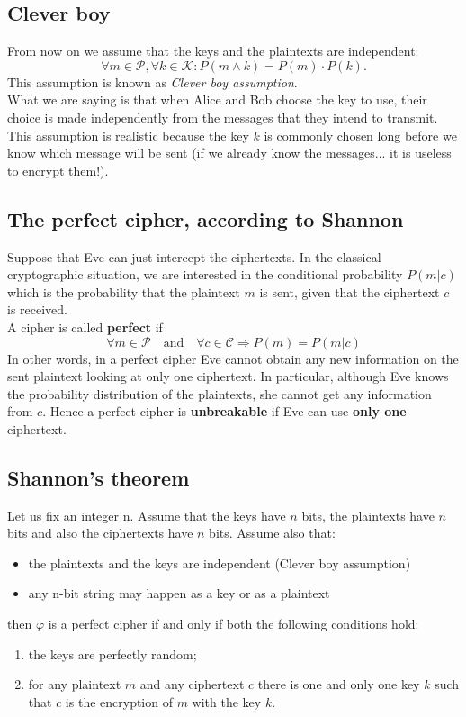\documentclass[a4paper, 10pt, titlepage]{article}
\begin{document}
\subsection{Clever boy}
From now on we assume that the keys and the plaintexts are independent:
$$\forall m \in \mathcal{P}, \forall k \in \mathcal{K} : P(m \wedge k) = P(m) \cdot P(k).$$
This assumption is known as \textit{Clever boy assumption}.\\
What we are saying is that when Alice and Bob choose the key to use,
their choice is made independently from the messages that they intend to transmit. This assumption is realistic because the key $k$ is commonly chosen long before we know which message will be sent (if we already know the messages... it is useless to encrypt them!).

\subsection{The perfect cipher, according to Shannon}
Suppose that Eve can just intercept the ciphertexts. In the classical cryptographic situation, we are interested in the conditional probability $P(m|c)$ which is the probability that the plaintext $m$ is sent, given that the ciphertext $c$ is received. \\
A cipher is called \textbf{perfect} if
$$\forall m \in \mathcal{P} \quad \text{and} \quad \forall c \in \mathcal{C} \Rightarrow P(m) = P(m|c)$$
In other words, in a perfect cipher Eve cannot obtain any new information on the sent plaintext looking at only one ciphertext.
In particular, although Eve knows the probability distribution of the plaintexts, she cannot get any information from $c$. Hence a perfect cipher is \textbf{unbreakable} if Eve can use \textbf{only one} ciphertext.

\subsection{Shannon's theorem}
Let us fix an integer n. Assume that the keys have $n$ bits, the plaintexts have $n$ bits and also the ciphertexts have $n$ bits.
Assume also that:
\begin{itemize}
\item the plaintexts and the keys are independent (Clever boy assumption)
\item any n-bit string may happen as a key or as a plaintext
\end{itemize}
then $\varphi$ is a perfect cipher if and only if both the following conditions hold:
\begin{enumerate}
\item the keys are perfectly random;
\item for any plaintext $m$ and any ciphertext $c$ there is one and only one key $k$ such that $c$ is the encryption of $m$ with the key $k$.
\end{enumerate}
\end{document}
